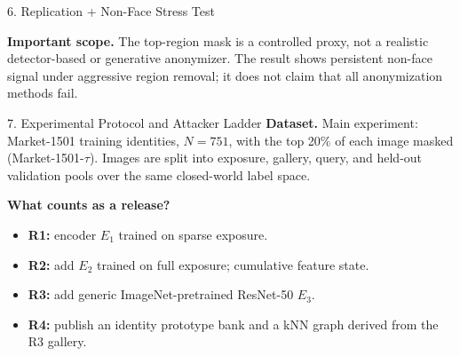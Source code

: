 \documentclass[final]{article}
\newcommand{\fsBody}{\fontsize{25}{29}}   %
\newcommand{\smallbody}{\fsBody\selectfont}
\newcommand{\mhead}[1]{\textbf{\color{navy}#1}}
\begin{document}
\begin{minipage}[t]{\textwidth}
\begin{minipage}[t]{0.388\textwidth}
\begin{sectionbox}{6. Replication + Non-Face Stress Test}
\vspace{0.0635in}
\begin{warnbox}
\smallbody
\textbf{Important scope.} The top-region mask is a controlled proxy, not a realistic detector-based or generative anonymizer. The result shows persistent non-face signal under aggressive region removal; it does not claim that all anonymization methods fail.
\end{warnbox}
\end{sectionbox}

\end{minipage}\hfill
\begin{minipage}[t]{0.292\textwidth}
\vspace{0pt}

\begin{sectionbox}{7. Experimental Protocol and Attacker Ladder}
\smallbody
\mhead{Dataset.} Main experiment: Market-1501 training identities, $N=751$, with the top 20\% of each image masked (Market-1501-$\tau$). Images are split into exposure, gallery, query, and held-out validation pools over the same closed-world label space.

\vspace{0.0476in}
\mhead{What counts as a release?}
\begin{itemize}
  \item \textbf{R1:} encoder $E_1$ trained on sparse exposure.
  \item \textbf{R2:} add $E_2$ trained on full exposure; cumulative feature state.
  \item \textbf{R3:} add generic ImageNet-pretrained ResNet-50 $E_3$.
  \item \textbf{R4:} publish an identity prototype bank and a kNN graph derived from the R3 gallery.
\end{itemize}


\end{sectionbox}
\end{minipage}
\end{minipage}
\end{document}
